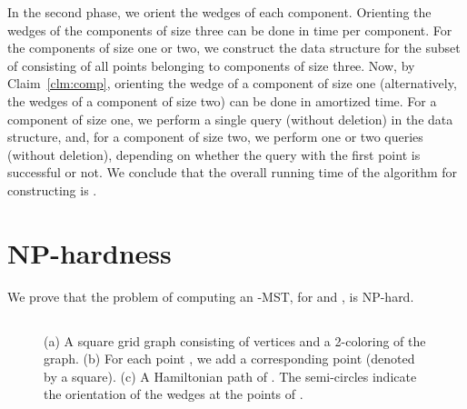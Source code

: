 \documentclass[11pt]{article}
\begin{document}
{In the second phase, we orient the wedges of each component. Orienting the wedges of the components of size three can be done in  time per component. For the components of size one or two, we construct the data structure for the subset of  consisting of all points belonging to components of size three. Now, by Claim~\ref{clm:comp}, orienting the wedge of a component of size one (alternatively, the wedges of a component of size two) can be done in amortized  time. For a component of size one, we perform a single query (without deletion) in the data structure, and, for a component of size two, we perform one or two queries (without deletion), depending on whether the query with the first point is successful or not.  
We conclude that the overall running time of the algorithm for constructing  is .





\vspace{-3mm}
\section{NP-hardness}

We prove that the problem of computing an -MST, for  and , is NP-hard.

\vspace{-3mm}
\subsection{}

\begin{figure}[htb]
\centering
  \hspace{.75cm}
  \hspace{.75cm}
 	\caption{(a) A square grid graph  consisting of  vertices and a 2-coloring of the graph. (b) For each point , we add a corresponding point  (denoted by a square). (c) A Hamiltonian path of . The semi-circles indicate the orientation of the wedges at the points of .}
 	\label{fig:reduction180}	
\end{figure} 

}
\end{document}
